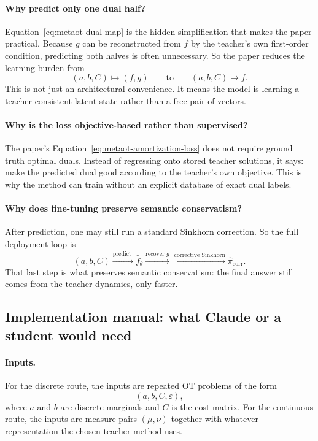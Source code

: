 \documentclass[11pt]{report}
\begin{document}
\paragraph{Why predict only one dual half?}
Equation~\eqref{eq:metaot-dual-map} is the hidden simplification that makes the
paper practical.  Because $g$ can be reconstructed from $f$ by the teacher's own
first-order condition, predicting both halves is often unnecessary.  So the paper
reduces the learning burden from
\begin{equation}
(a,b,C)\mapsto (f,g)
\qquad\text{to}\qquad
(a,b,C)\mapsto f.
\label{eq:metaot-single-half-idea}
\end{equation}
This is not just an architectural convenience.  It means the model is learning a
teacher-consistent latent state rather than a free pair of vectors.

\paragraph{Why is the loss objective-based rather than supervised?}
The paper's Equation~\eqref{eq:metaot-amortization-loss} does not require ground
truth optimal duals.  Instead of regressing onto stored teacher solutions, it says:
make the predicted dual good according to the teacher's own objective.  This is why
the method can train without an explicit database of exact dual labels.

\paragraph{Why does fine-tuning preserve semantic conservatism?}
After prediction, one may still run a standard Sinkhorn correction.  So the
full deployment loop is
\begin{equation}
(a,b,C)
\xrightarrow{\text{predict }} \widehat f_\theta
\xrightarrow{\text{recover }\widehat g}
\xrightarrow{\text{corrective Sinkhorn}}
\widehat\pi_{\mathrm{corr}}.
\label{eq:metaot-corrected-pipeline}
\end{equation}
That last step is what preserves semantic conservatism: the final answer still
comes from the teacher dynamics, only faster.

\subsection*{Implementation manual: what Claude or a student would need}

\paragraph{Inputs.}
For the discrete route, the inputs are repeated OT problems of the form
\begin{equation}
(a,b,C,\varepsilon),
\label{eq:metaot-inputs-discrete}
\end{equation}
where $a$ and $b$ are discrete marginals and $C$ is the cost matrix.  For the
continuous route, the inputs are measure pairs $(\mu,\nu)$ together with whatever
representation the chosen teacher method uses.
\end{document}
